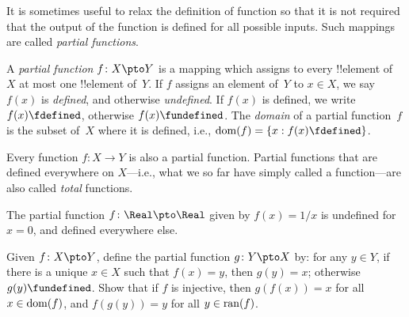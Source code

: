 \documentclass[../../../include/open-logic-section]{subfiles}
\begin{document}


\begin{explain}
It is sometimes useful to relax the definition of function so that it
is not required that the output of the function is defined for all
possible inputs. Such mappings are called \emph{partial functions}.
\end{explain}

\begin{defn}
A \emph{partial function} $f \colon X \pto Y$ is a mapping which
assigns to every !!{element} of~$X$ at most one !!{element} of~$Y$.
If $f$ assigns an element of~$Y$ to $x \in X$, we say $f(x)$ is
\emph{defined}, and otherwise \emph{undefined}. If $f(x)$ is defined,
we write $f(x) \fdefined$, otherwise $f(x) \fundefined$. The
\emph{domain} of a partial function~$f$ is the subset of~$X$ where it
is defined, i.e., $\dom{f} = \Setabs{x}{f(x) \fdefined}$.
\end{defn}

\begin{ex}
Every function $f\colon X \to Y$ is also a partial function. Partial
functions that are defined everywhere on $X$---i.e., what we so far
have simply called a function---are also called \emph{total}
functions.
\end{ex}

\begin{ex}
The partial function $f \colon \Real \pto \Real$ given by $f(x) = 1/x$
is undefined for $x = 0$, and defined everywhere else.
\end{ex}

\begin{prob}
Given $f\colon X \pto Y$, define the partial function $g\colon Y \pto
X$ by: for any $y \in Y$, if there is a unique $x \in X$ such that
$f(x) = y$, then $g(y) = x$; otherwise $g(y) \fundefined$.  Show that
if $f$ is injective, then $g(f(x)) = x$ for all $x \in \mathrm{dom}(f)$, and
$f(g(y)) = y$ for all $y \in \mathrm{ran}(f)$.
\end{prob}
\end{document}

